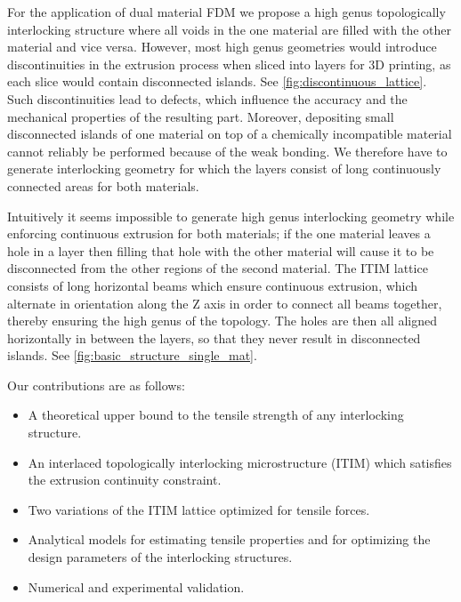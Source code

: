 For the application of dual material FDM we propose a high genus topologically interlocking structure where all voids in the one material are filled with the other material and vice versa.
However, most high genus geometries would introduce discontinuities in the extrusion process when sliced into layers for 3D printing, as each slice would contain disconnected islands.
See \cref{fig:discontinuous_lattice}.
Such discontinuities lead to defects, which influence the accuracy and the mechanical properties of the resulting part.
Moreover, depositing small disconnected islands of one material on top of a chemically incompatible material cannot reliably be performed because of the weak bonding.
We therefore have to generate interlocking geometry for which the layers consist of long continuously connected areas for both materials.

Intuitively it seems impossible to generate high genus interlocking geometry while enforcing continuous extrusion for both materials;
if the one material leaves a hole in a layer then filling that hole with the other material will cause it to be disconnected from the other regions of the second material.
The ITIM lattice consists of long horizontal beams which ensure continuous extrusion, which alternate in orientation along the Z axis in order to connect all beams together, thereby ensuring the high genus of the topology.
The holes are then all aligned horizontally in between the layers, so that they never result in disconnected islands.
See \cref{fig:basic_structure_single_mat}.


Our contributions are as follows:
\begin{itemize}
	\item A theoretical upper bound to the tensile strength of any interlocking structure.
	\item An interlaced topologically interlocking microstructure (ITIM) which satisfies the extrusion continuity constraint.
	\item Two variations of the ITIM lattice optimized for tensile forces.
	\item Analytical models for estimating tensile properties and for optimizing the design parameters of the interlocking structures.
	\item Numerical and experimental validation.
\end{itemize}






